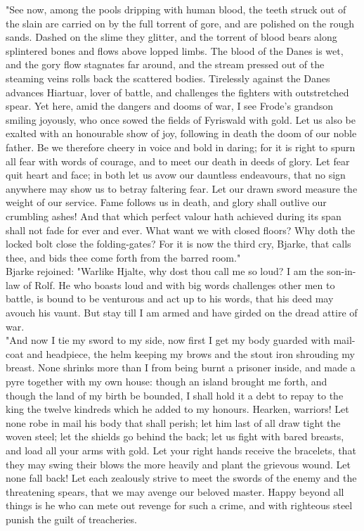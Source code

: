 \documentclass[10pt,a4paper]{report}
\begin{document}
"See now, among the pools dripping with human blood, the teeth struck out of the slain are carried on by the full torrent of gore, and are polished on the rough sands. Dashed on the slime they glitter, and the torrent of blood bears along splintered bones and flows above lopped limbs. The blood of the Danes is wet, and the gory flow stagnates far around, and the stream pressed out of the steaming veins rolls back the scattered bodies. Tirelessly against the Danes advances Hiartuar, lover of battle, and challenges the fighters with outstretched spear. Yet here, amid the dangers and dooms of war, I see Frode's grandson smiling joyously, who once sowed the fields of Fyriswald with gold. Let us also be exalted with an honourable show of joy, following in death the doom of our noble father. Be we therefore cheery in voice and bold in daring; for it is right to spurn all fear with words of courage, and to meet our death in deeds of glory. Let fear quit heart and face; in both let us avow our dauntless endeavours, that no sign anywhere may show us to betray faltering fear. Let our drawn sword measure the weight of our service. Fame follows us in death, and glory shall outlive our crumbling ashes! And that which perfect valour hath achieved during its span shall not fade for ever and ever. What want we with closed floors? Why doth the locked bolt close the folding-gates? For it is now the third cry, Bjarke, that calls thee, and bids thee come forth from the barred room."\\

Bjarke rejoined: "Warlike Hjalte, why dost thou call me so loud? I am the son-in-law of Rolf. He who boasts loud and with big words challenges other men to battle, is bound to be venturous and act up to his words, that his deed may avouch his vaunt. But stay till I am armed and have girded on the dread attire of war.\\

"And now I tie my sword to my side, now first I get my body guarded with mail-coat and headpiece, the helm keeping my brows and the stout iron shrouding my breast. None shrinks more than I from being burnt a prisoner inside, and made a pyre together with my own house: though an island brought me forth, and though the land of my birth be bounded, I shall hold it a debt to repay to the king the twelve kindreds which he added to my honours. Hearken, warriors! Let none robe in mail his body that shall perish; let him last of all draw tight the woven steel; let the shields go behind the back; let us fight with bared breasts, and load all your arms with gold. Let your right hands receive the bracelets, that they may swing their blows the more heavily and plant the grievous wound. Let none fall back! Let each zealously strive to meet the swords of the enemy and the threatening spears, that we may avenge our beloved master. Happy beyond all things is he who can mete out revenge for such a crime, and with righteous steel punish the guilt of treacheries.\\
\end{document}

